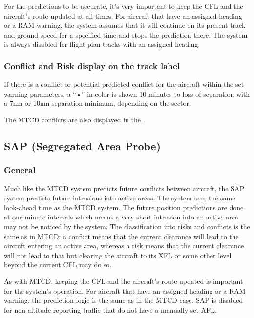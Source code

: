\documentclass[a4paper,oneside,11pt]{memoir}
\begin{document}
For the predictions to be accurate, it’s very important to keep the CFL and the aircraft’s route updated at all times. For aircraft that have an assigned heading or a RAM warning, the system assumes that it will continue on its present track and ground speed for a specified time and stops the prediction there. The system is always disabled for flight plan tracks with an assigned heading.

\subsubsection*{Conflict and Risk display on the track label}

If there is a conflict or potential predicted conflict for the aircraft within the set warning parameters, a “•” in  color is shown 10 minutes to loss of separation with a 7nm or 10nm separation minimum, depending on the sector.

\bigskip

The MTCD conflicts are also displayed in the .

\subsection{SAP (Segregated Area Probe)}
\label{tool:SAP}
\subsubsection*{General}

Much like the MTCD system predicts future conflicts between aircraft, the SAP system predicts future intrusions into active areas. The system uses the same look-ahead time as the MTCD system. The future position predictions are done at one-minute intervals which means a very short intrusion into an active area may not be noticed by the system. The classification into risks and conflicts is the same as in MTCD: a conflict means that the current clearance will lead to the aircraft entering an active area, whereas a risk means that the current clearance will not lead to that but clearing the aircraft to its XFL or some other level beyond the current CFL may do so.

\bigskip

As with MTCD, keeping the CFL and the aircraft’s route updated is important for the system’s operation. For aircraft that have an assigned heading or a RAM warning, the prediction logic is the same as in the MTCD case. SAP is disabled for non-altitude reporting traffic that do not have a manually set AFL.
\end{document}
